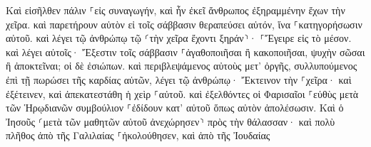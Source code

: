 \documentclass{openreader}
\begin{document}
Καὶ εἰσῆλθεν πάλιν ⸀εἰς συναγωγήν, καὶ ἦν ἐκεῖ ἄνθρωπος ἐξηραμμένην ἔχων τὴν χεῖρα. 
καὶ παρετήρουν αὐτὸν εἰ τοῖς σάββασιν θεραπεύσει αὐτόν, ἵνα ⸀κατηγορήσωσιν αὐτοῦ. 
καὶ λέγει τῷ ἀνθρώπῳ τῷ ⸂τὴν χεῖρα ἔχοντι ξηράν⸃· ⸀Ἔγειρε εἰς τὸ μέσον. 
καὶ λέγει αὐτοῖς· Ἔξεστιν τοῖς σάββασιν ⸀ἀγαθοποιῆσαι ἢ κακοποιῆσαι, ψυχὴν σῶσαι ἢ ἀποκτεῖναι; οἱ δὲ ἐσιώπων. 
καὶ περιβλεψάμενος αὐτοὺς μετ’ ὀργῆς, συλλυπούμενος ἐπὶ τῇ πωρώσει τῆς καρδίας αὐτῶν, λέγει τῷ ἀνθρώπῳ· Ἔκτεινον τὴν ⸀χεῖρα· καὶ ἐξέτεινεν, καὶ ἀπεκατεστάθη ἡ χεὶρ ⸀αὐτοῦ. 
καὶ ἐξελθόντες οἱ Φαρισαῖοι ⸀εὐθὺς μετὰ τῶν Ἡρῳδιανῶν συμβούλιον ⸀ἐδίδουν κατ’ αὐτοῦ ὅπως αὐτὸν ἀπολέσωσιν. 
Καὶ ὁ Ἰησοῦς ⸂μετὰ τῶν μαθητῶν αὐτοῦ ἀνεχώρησεν⸃ πρὸς τὴν θάλασσαν· καὶ πολὺ πλῆθος ἀπὸ τῆς Γαλιλαίας ⸀ἠκολούθησεν, καὶ ἀπὸ τῆς Ἰουδαίας 
\end{document}
